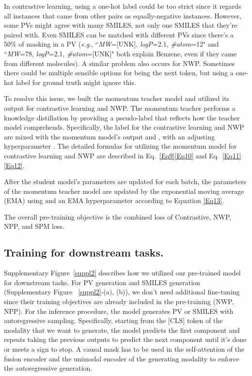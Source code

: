 \documentclass{nature_meth}
\newcommand{\1}{\blmath{1}}
\newcommand{\0}{\blmath{0}}
\begin{document}
In contrastive learning, using a one-hot label could be too strict since it regards all instances that came from other pairs as equally-negative instances. However, some PVs might agree with many SMILES, not only one SMILES that they're paired with. Even SMILES can be matched with different PVs since there's a 50\% of masking in a PV (\textit{e}.\textit{g}.,  ``\emph{MW}=[UNK], \emph{logP}=2.1, \emph{\#atom}=12" and ``\emph{MW}=78, \emph{logP}=2.1, \emph{\#atom}=[UNK]" both explain Benzene, even if they came from different molecules).
A similar problem also occurs for NWP. Sometimes there could be multiple sensible options for being the next token, but using a one-hot label for ground truth might ignore this.

To resolve this issue, we built the momentum teacher model\cite{moco,albef} and utilized its output for contrastive learning and NWP. The momentum teacher performs a knowledge distillation by providing a pseudo-label that reflects how the teacher model comprehends.
Specifically, the label for the contrastive learning and NWP are mixed with the momentum model's output  and , with an adjusting hyperparameter . The detailed formulas for utilizing the momentum model for contrastive learning and NWP are described in Eq.~\eqref{Eq9}\eqref{Eq10} and Eq.~\eqref{Eq11}\eqref{Eq12}. 

After the student model's parameters  are updated for each batch, the parameters of the momentum teacher model  are updated by the exponential moving average (EMA) using  and an EMA hyperparameter  according to Equation \ref{Eq13}.


The overall pre-training objective is the combined loss of Contrastive, NWP, NPP, and SPM loss.


\subsection{Training for downstream tasks.}
Supplementary Figure~\ref{suppl2} describes how we utilized our pre-trained model for downstream tasks. 
For PV generation and SMILES generation (Supplementary Figure ~\ref{suppl2}-(a), (b)), we don't need additional fine-tuning since their training objectives are already included in the pre-training (NWP, NPP). For the inference procedure, the model generates PV or SMILES with autoregressive sampling. Specifically, starting from the [CLS] token of the modality that we want to generate, the model predicts the first component and repeats taking the previous outputs to predict the next component until it's done or meets a sign to stop. A causal mask has to be used in the self-attention of the fusion encoder and the unimodal encoder of the generating modality to enforce the autoregressive generation.
\end{document}
